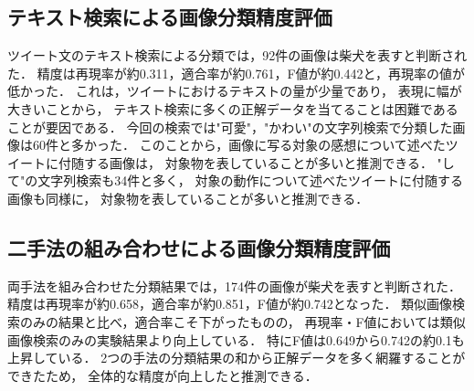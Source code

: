 \subsection{テキスト検索による画像分類精度評価}
ツイート文のテキスト検索による分類では，92件の画像は柴犬を表すと判断された．
精度は再現率が約0.311，適合率が約0.761，F値が約0.442と，再現率の値が低かった．
これは，ツイートにおけるテキストの量が少量であり，
表現に幅が大きいことから，
テキスト検索に多くの正解データを当てることは困難であることが要因である．
今回の検索では"可愛"，"かわい"の文字列検索で分類した画像は60件と多かった．
このことから，画像に写る対象の感想について述べたツイートに付随する画像は，
対象物を表していることが多いと推測できる．
"して"の文字列検索も34件と多く，
対象の動作について述べたツイートに付随する画像も同様に，
対象物を表していることが多いと推測できる．

\subsection{二手法の組み合わせによる画像分類精度評価}
両手法を組み合わせた分類結果では，174件の画像が柴犬を表すと判断された．
精度は再現率が約0.658，適合率が約0.851，F値が約0.742となった．
類似画像検索のみの結果と比べ，適合率こそ下がったものの，
再現率・F値においては類似画像検索のみの実験結果より向上している．
特にF値は0.649から0.742の約0.1も上昇している．
2つの手法の分類結果の和から正解データを多く網羅することができたため，
全体的な精度が向上したと推測できる．

